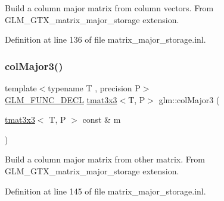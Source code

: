 Build a column major matrix from column vectors. From G\+L\+M\+\_\+\+G\+T\+X\+\_\+matrix\+\_\+major\+\_\+storage extension. 

Definition at line 136 of file matrix\+\_\+major\+\_\+storage.\+inl.

\mbox{\label{group__gtx__matrix__major__storage_gaa93f3dcc47ced18e5db4a853363d9386}} 
\subsubsection{\texorpdfstring{colMajor3()}{colMajor3()}\hspace{0.1cm}{\footnotesize\ttfamily [2/2]}}
{\footnotesize\ttfamily template$<$typename T , precision P$>$ \\
\mbox{\hyperlink{setup_8hpp_ab2d052de21a70539923e9bcbf6e83a51}{G\+L\+M\+\_\+\+F\+U\+N\+C\+\_\+\+D\+E\+CL}} \mbox{\hyperlink{structglm_1_1tmat3x3}{tmat3x3}}$<$T, P$>$ glm\+::col\+Major3 (\begin{DoxyParamCaption}\item[{\mbox{\hyperlink{structglm_1_1tmat3x3}{tmat3x3}}$<$ T, P $>$ const \&}]{m }\end{DoxyParamCaption})}

Build a column major matrix from other matrix. From G\+L\+M\+\_\+\+G\+T\+X\+\_\+matrix\+\_\+major\+\_\+storage extension. 

Definition at line 145 of file matrix\+\_\+major\+\_\+storage.\+inl.

\mbox{\label{group__gtx__matrix__major__storage_ga2829de096bb67ab5cd670958f3d402b6}} 
